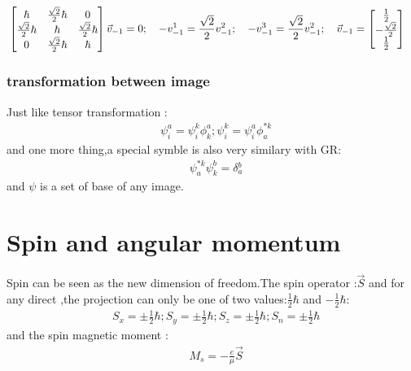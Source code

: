 \documentclass{article}
\begin{document}
\begin{align}
&\begin{bmatrix}\hbar&\frac{\sqrt{2}}2\hbar&0\\\frac{\sqrt{2}}2\hbar&\hbar&\frac{\sqrt{2}}2\hbar\\0&\frac{\sqrt{2}}2\hbar&\hbar\end{bmatrix}\vec v_{-1}=0;\quad -v_{-1}^1=\frac{\sqrt{2}}2v_{-1}^2;\quad -v_{-1}^3=\frac{\sqrt{2}}2v_{-1}^2;\quad \vec v_{-1}=\begin{bmatrix}\frac12\\-\frac{\sqrt{2}}2\\\frac12\end{bmatrix} \notag
\end{align}
\subsubsection{transformation between image}
Just like tensor transformation :
\begin{align}
&\psi_i^a=\psi_i^k\phi_k^a;\psi_i^k=\psi^a_i\phi^{*k}_a 
\end{align}
  and one more thing,a special symble is also very similary with GR:
  \begin{align}
  &\psi^{*k}_a\psi_k^b= \delta {^b_a} 
  \end{align}
  and $\psi$ is a set of base of any image.
\section{Spin and angular momentum}
Spin can be seen as the new dimension of freedom.The spin operator :$\vec S$ and for any direct ,the projection can only be one of two values:$\frac12\hbar$ and $-\frac12\hbar$:
\begin{align}
&S_x=\pm\frac12\hbar;S_y=\pm\frac12\hbar;S_z=\pm\frac12\hbar;S_n=\pm\frac12\hbar
\end{align}
and the  spin magnetic moment :\begin{align}&M_s=-\frac{e}{\mu}\vec S\end{align}
\end{document}
